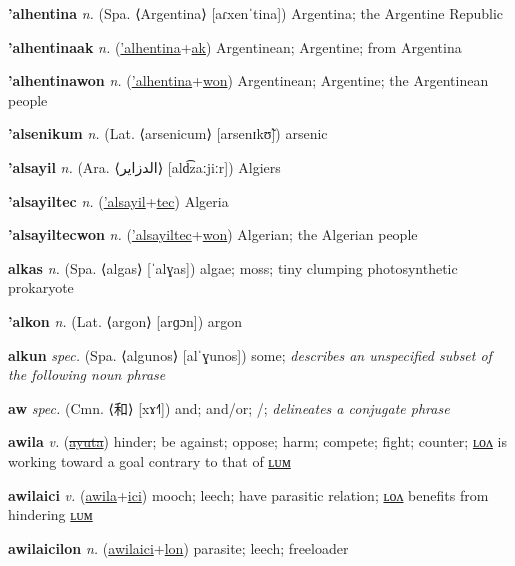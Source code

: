 \textbf{\hypertarget{'alhentina}{'alhentina}} \textit{n.} (Spa. ⟨Argentina⟩ [aɾxenˈtina])
Argentina; the Argentine Republic

\textbf{\hypertarget{'alhentinaak}{'alhentinaak}} \textit{n.} (\hyperlink{'alhentina}{'alhentina}+\allowbreak \hyperlink{ak}{ak})
Argentinean; Argentine; from Argentina

\textbf{\hypertarget{'alhentinawon}{'alhentinawon}} \textit{n.} (\hyperlink{'alhentina}{'alhentina}+\allowbreak \hyperlink{won}{won})
Argentinean; Argentine; the Argentinean people

\textbf{\hypertarget{'alsenikum}{'alsenikum}} \textit{n.} (Lat. ⟨arsenicum⟩ [arsenɪkʊ̃])
arsenic

\textbf{\hypertarget{'alsayil}{'alsayil}} \textit{n.} (Ara. ⟨{\arabics{}الدزاير}⟩ [ald͡zaːjiːr])
Algiers

\textbf{\hypertarget{'alsayiltec}{'alsayiltec}} \textit{n.} (\hyperlink{'alsayil}{'alsayil}+\allowbreak \hyperlink{tec}{tec})
Algeria

\textbf{\hypertarget{'alsayiltecwon}{'alsayiltecwon}} \textit{n.} (\hyperlink{'alsayiltec}{'alsayiltec}+\allowbreak \hyperlink{won}{won})
Algerian; the Algerian people

\textbf{\hypertarget{alkas}{alkas}} \textit{n.} (Spa. ⟨algas⟩ [ˈalɣas])
algae; moss; tiny clumping photosynthetic prokaryote

\textbf{\hypertarget{'alkon}{'alkon}} \textit{n.} (Lat. ⟨argon⟩ [arɡɔn])
argon

\textbf{\hypertarget{alkun}{alkun}} \textit{spec.} (Spa. ⟨algunos⟩ [alˈɣunos])
some; \textit{describes an unspecified subset of the following noun phrase}

\textbf{\hypertarget{aw}{aw}} \textit{spec.} (Cmn. ⟨{\chinese{}和}⟩ [xɤ˧˥])
and; and/or; /; \textit{delineates a conjugate phrase}

\textbf{\hypertarget{awila}{awila}} \textit{v.} (\hyperlink{ayuta}{\sout{ayuta}})
hinder; be against; oppose; harm; compete; fight; counter; \hyperlink{awilalon}{ʟᴏᴧ} is working toward a goal contrary to that of \hyperlink{awilalum}{ʟᴜᴍ}

\textbf{\hypertarget{awilaici}{awilaici}} \textit{v.} (\hyperlink{awila}{awila}+\allowbreak \hyperlink{ici}{ici})
mooch; leech; have parasitic relation; \hyperlink{awilaicilon}{ʟᴏᴧ} benefits from hindering \hyperlink{awilaicilum}{ʟᴜᴍ}

\textbf{\hypertarget{awilaicilon}{awilaicilon}} \textit{n.} (\hyperlink{awilaici}{awilaici}+\allowbreak \hyperlink{lon}{lon})
parasite; leech; freeloader

